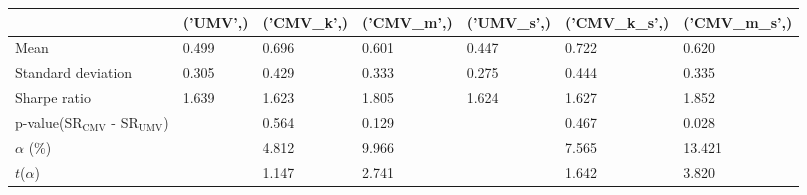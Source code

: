 \begin{tabular}{lllllll}
\toprule
 & ('UMV',) & ('CMV_k',) & ('CMV_m',) & ('UMV_s',) & ('CMV_k_s',) & ('CMV_m_s',) \\
\midrule
Mean & 0.499 & 0.696 & 0.601 & 0.447 & 0.722 & 0.620 \\
Standard deviation & 0.305 & 0.429 & 0.333 & 0.275 & 0.444 & 0.335 \\
Sharpe ratio & 1.639 & 1.623 & 1.805 & 1.624 & 1.627 & 1.852 \\
p-value(SR$_{\text{CMV}}$ - SR$_{\text{UMV}}$) &  & 0.564 & 0.129 &  & 0.467 & 0.028 \\
$\alpha$ (\%) &  & 4.812 & 9.966 &  & 7.565 & 13.421 \\
$t$($\alpha$) &  & 1.147 & 2.741 &  & 1.642 & 3.820 \\
\bottomrule
\end{tabular}
